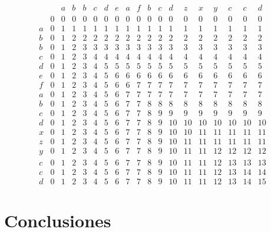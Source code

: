 \documentclass[10pt,a4paper]{article}
\begin{document}
\begin{itemize}
	\[
	\begin{matrix}
      &   & a & b & b & c & d & e & a & f & b & c & d & z & x & y & c & c & d \\
      & 0 & 0 & 0 & 0 & 0 & 0 & 0 & 0 & 0 & 0 & 0 & 0 & 0 & 0 & 0 & 0 & 0 & 0 \\
    a & 0 & 1 & 1 & 1 & 1 & 1 & 1 & 1 & 1 & 1 & 1 & 1 & 1 & 1 & 1 & 1 & 1 & 1 \\
    b & 0 & 1 & 2 & 2 & 2 & 2 & 2 & 2 & 2 & 2 & 2 & 2 & 2 & 2 & 2 & 2 & 2 & 2 \\
    b & 0 & 1 & 2 & 3 & 3 & 3 & 3 & 3 & 3 & 3 & 3 & 3 & 3 & 3 & 3 & 3 & 3 & 3 \\
    c & 0 & 1 & 2 & 3 & 4 & 4 & 4 & 4 & 4 & 4 & 4 & 4 & 4 & 4 & 4 & 4 & 4 & 4 \\
    d & 0 & 1 & 2 & 3 & 4 & 5 & 5 & 5 & 5 & 5 & 5 & 5 & 5 & 5 & 5 & 5 & 5 & 5 \\
    e & 0 & 1 & 2 & 3 & 4 & 5 & 6 & 6 & 6 & 6 & 6 & 6 & 6 & 6 & 6 & 6 & 6 & 6 \\
    f & 0 & 1 & 2 & 3 & 4 & 5 & 6 & 6 & 7 & 7 & 7 & 7 & 7 & 7 & 7 & 7 & 7 & 7 \\
    a & 0 & 1 & 2 & 3 & 4 & 5 & 6 & 7 & 7 & 7 & 7 & 7 & 7 & 7 & 7 & 7 & 7 & 7 \\
    b & 0 & 1 & 2 & 3 & 4 & 5 & 6 & 7 & 7 & 8 & 8 & 8 & 8 & 8 & 8 & 8 & 8 & 8 \\
    c & 0 & 1 & 2 & 3 & 4 & 5 & 6 & 7 & 7 & 8 & 9 & 9 & 9 & 9 & 9 & 9 & 9 & 9 \\
    d & 0 & 1 & 2 & 3 & 4 & 5 & 6 & 7 & 7 & 8 & 9 & 10 & 10 & 10 & 10 & 10 & 10 & 10  \\
    x & 0 & 1 & 2 & 3 & 4 & 5 & 6 & 7 & 7 & 8 & 9 & 10 & 10 & 11 & 11 & 11 & 11 & 11\\
    z & 0 & 1 & 2 & 3 & 4 & 5 & 6 & 7 & 7 & 8 & 9 & 10 & 11 & 11 & 11 & 11 & 11 & 11 \\
    y & 0 & 1 & 2 & 3 & 4 & 5 & 6 & 7 & 7 & 8 & 9 & 10 & 11 & 11 & 12 & 12 & 12 & 12\\
    c & 0 & 1 & 2 & 3 & 4 & 5 & 6 & 7 & 7 & 8 & 9 & 10 & 11 & 11 & 12 & 13 & 13 & 13 \\
    c & 0 & 1 & 2 & 3 & 4 & 5 & 6 & 7 & 7 & 8 & 9 & 10 & 11 & 11 & 12 & 13 & 14 & 14 \\
    d & 0 & 1 & 2 & 3 & 4 & 5 & 6 & 7 & 7 & 8 & 9 & 10 & 11 & 11 & 12 & 13 & 14 & 15 
	\end{matrix}
	\]
	
\end{itemize}

\section{Conclusiones}
\end{document}
